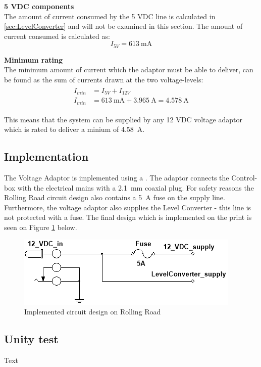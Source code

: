 \textbf{5 VDC components}\\
The amount of current consumed by the 5 VDC line is calculated in \vref{sec:LevelConverter} and will not be examined in this section. The amount of current consumed is calculated as:
\begin{equation}
	I_{5V} = \SI{613}{\milli \ampere}
\end{equation}

\textbf{Minimum rating}\\
The minimum amount of current which the adaptor must be able to deliver, can be found as the sum of currents drawn at the two voltage-levels:
\begin{align}
	\begin{split}
		I_{min} &= I_{5V} + I_{12V}\\
		I_{min} &= \SI{613}{\milli \ampere} + \SI{3.965}{\ampere} = \SI{4.578}{\ampere}
	\end{split}
\end{align}

This means that the system can be supplied by any 12 VDC voltage adaptor which is rated to deliver a minium of \SI{4.58}{\ampere}.

\subsection{Implementation}
The Voltage Adaptor is implemented using a . The adaptor connects the Control-box with the electrical mains with a \SI{2.1}{\milli \meter} coaxial plug. For safety reasons the Rolling Road circuit design also contains a \SI{5}{\ampere} fuse on the supply line. Furthermore, the voltage adaptor also supplies the Level Converter - this line is not protected with a fuse. The final design which is implemented on the print is seen on Figure \ref{fig:DesignVoltageAdaptor} below.

\begin{figure}[H]
	\centering
	\includegraphics[width=0.5\linewidth]{Hardware/Pictures/DesignVoltageAdaptor}
	\caption{Implemented circuit design on Rolling Road}
	\label{fig:DesignVoltageAdaptor}
\end{figure}

\subsection{Unity test}
Text